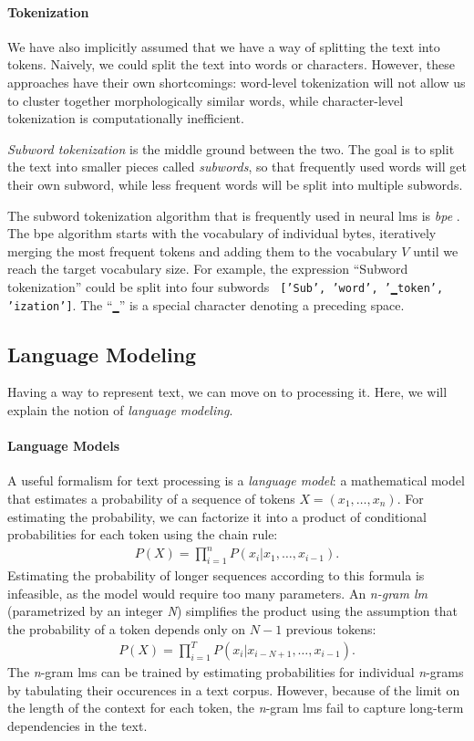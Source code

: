 \paragraph{Tokenization} We have also implicitly assumed that we have a way of splitting the text into tokens. Naively, we could split the text into words or characters. However, these approaches have their own shortcomings: word-level tokenization will not allow us to cluster together morphologically similar words, while character-level tokenization is computationally inefficient.

\emph{Subword tokenization}  is the middle ground between the two. The goal is to split the text into smaller pieces called \emph{subwords}, so that frequently used words will get their own subword, while less frequent words will be split into multiple subwords.

The subword tokenization algorithm that is frequently used in neural \acp{lm} is \emph{\ac{bpe}} \cite{sennrich2016neural}. The \ac{bpe} algorithm starts with the vocabulary of individual bytes, iteratively merging the most frequent tokens and adding them to the vocabulary $V$ until we reach the target vocabulary size. For example, the expression ``Subword tokenization'' could be split into four subwords \texttt{ ['Sub', 'word', '▁token', 'ization']}. The ``\texttt{▁}'' is a special character denoting a preceding space.


\subsection{Language Modeling}
Having a way to represent text, we can move on to processing it. Here, we will explain the notion of \emph{language modeling}.

\paragraph{Language Models} A useful formalism for text processing is a \emph{language model}: a mathematical model that estimates a probability of a sequence of tokens $X = (x_1, \ldots, x_n)$. For estimating the probability, we can factorize it into a product of conditional probabilities for each token using the chain rule:
\begin{align}
    P(X) = \prod_{i=1}^n P(x_i|x_1, \hdots, x_{i-1}).
\end{align}
Estimating the probability of longer sequences according to this formula is infeasible, as the model would require too many parameters. An \emph{\emph{n}-gram \ac{lm}} (parametrized by an integer \emph{N}) simplifies the product using the assumption that the probability of a token depends only on $N-1$ previous tokens:
\begin{align}
    P(X) = \prod_{i=1}^T P(x_i|x_{i-N+1}, \hdots,x_{i-1}).
\end{align}
The \emph{n}-gram \acp{lm} can be trained by estimating probabilities for individual \emph{n}-grams by tabulating their occurences in a text corpus. However, because of the limit on the length of the context for each token, the \emph{n}-gram \acp{lm} fail to capture long-term dependencies in the text.




